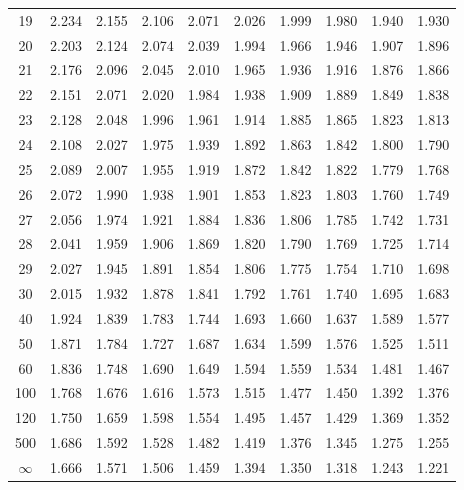 \documentclass[12pt]{article}
\begin{document}
\begin{table}
\begin{center}
{\begin{tabular}{|c|c|c|c|c|c|c|c|c|c|}
19 & 2.234 &2.155 &2.106 &2.071 &2.026 &1.999 &1.980 &1.940 &1.930\\
20 & 2.203 &2.124 &2.074 &2.039 &1.994 &1.966 &1.946 &1.907 &1.896\\
21 & 2.176 &2.096 &2.045 &2.010 &1.965 &1.936 &1.916 &1.876 &1.866\\
22 & 2.151 &2.071 &2.020 &1.984 &1.938 &1.909 &1.889 &1.849 &1.838\\
23 & 2.128 &2.048 &1.996 &1.961 &1.914 &1.885 &1.865 &1.823 &1.813\\
24 & 2.108 &2.027 &1.975 &1.939 &1.892 &1.863 &1.842 &1.800 &1.790\\
25 & 2.089 &2.007 &1.955 &1.919 &1.872 &1.842 &1.822 &1.779 &1.768\\
26 & 2.072 &1.990 &1.938 &1.901 &1.853 &1.823 &1.803 &1.760 &1.749\\
27 & 2.056 &1.974 &1.921 &1.884 &1.836 &1.806 &1.785 &1.742 &1.731\\
28 & 2.041 &1.959 &1.906 &1.869 &1.820 &1.790 &1.769 &1.725 &1.714\\
29 & 2.027 &1.945 &1.891 &1.854 &1.806 &1.775 &1.754 &1.710 &1.698\\
30 & 2.015 &1.932 &1.878 &1.841 &1.792 &1.761 &1.740 &1.695 &1.683\\
40 & 1.924 &1.839 &1.783 &1.744 &1.693 &1.660 &1.637 &1.589 &1.577\\
50 & 1.871 &1.784 &1.727 &1.687 &1.634 &1.599 &1.576 &1.525 &1.511\\
60 & 1.836 &1.748 &1.690 &1.649 &1.594 &1.559 &1.534 &1.481 &1.467\\
100 & 1.768 &1.676 &1.616 &1.573 &1.515 &1.477 &1.450 &1.392 &1.376\\
120 & 1.750 &1.659 &1.598 &1.554 &1.495 &1.457 &1.429 &1.369 &1.352\\
500 & 1.686 &1.592 &1.528 &1.482 &1.419 &1.376 &1.345 &1.275 &1.255\\ \hline
$\infty$ & 1.666 &1.571 &1.506 &1.459 &1.394 &1.350 &1.318 &1.243 &1.221\\
  \hline
\end{tabular}
}
\end{center}
\end{table}

\end{document}
